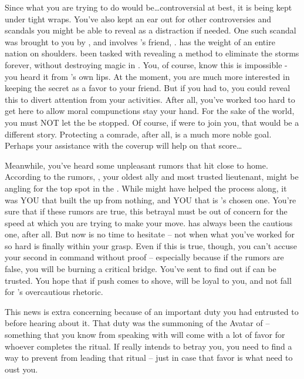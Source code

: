 \documentclass[char]{GL2020}
\begin{document}
Since what you are trying to do would be\ldots controversial at best, it is being kept under tight wraps. You’ve also kept an ear out for other controversies and scandals you might be able to reveal as a distraction if needed. One such scandal was brought to you by \cChupInventor{}, and involves \cChupInventor{}’s friend, \cHeadScientist{}. \cHeadScientist{} has the weight of an entire nation on \cHeadScientist{\their} shoulders. \cHeadScientist{\They} \cHeadScientist{\have} been tasked with revealing a method to eliminate the storms forever, without destroying magic in \pEarth{}. You, of course, know this is impossible - you heard it from \cGenesis{}’s own lips. At the moment, you are much more interested in keeping the secret as a favor to your friend. But if you had to, you could reveal this to divert attention from your activities. After all, you’ve worked too hard to get here to allow moral compunctions stay your hand. For the sake of the world, you must NOT let the \pGoaties{} be stopped. Of course, if \cHeadScientist{} were to join you, that would be a different story. Protecting a comrade, after all, is a much more noble goal. Perhaps your assistance with the coverup will help on that score\ldots

Meanwhile, you’ve heard some unpleasant rumors that hit close to home. According to the rumors, \cChupSecond{}, your oldest ally and most trusted lieutenant, might be angling for the top spot in the \pGoaties{}. While \cChupSecond{} might have helped the process along, it was YOU that built the \pGoaties{} up from nothing, and YOU that is \cGenesis{}’s chosen one. You’re sure that if these rumors are true, this betrayal must be out of concern for the speed at which you are trying to make your move. \cChupSecond{} has always been the cautious one, after all. But now is no time to hesitate -- not when what you’ve worked for so hard is finally within your grasp. Even if this is true, though, you can’t accuse your second in command without proof -- especially because if the rumors are false, you will be burning a critical bridge. You’ve sent \cChupStudent{} to find out if \cChupSecond{} can be trusted. You hope that if push comes to shove, \cChupStudent{} will be loyal to you, and not fall for \cChupSecond{}’s overcautious rhetoric.

This news is extra concerning because of an important duty you had entrusted to \cChupSecond{} before hearing about it. That duty was the summoning of the Avatar of \cGenesis{} -- something that you know from speaking with \cGenesis{} will come with a lot of favor for whoever completes the ritual. If \cChupSecond{} really intends to betray you, you need to find a way to prevent \cChupSecond{\them} from leading that ritual -- just in case that favor is what \cChupSecond{\they} need\cChupSecond{\plural} to oust you.
\end{document}
